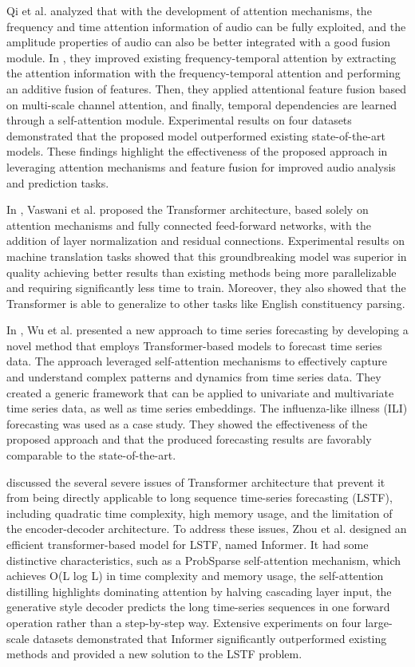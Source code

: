 Qi et al. analyzed that with the development of attention mechanisms, the frequency and time attention information of audio can be fully exploited, and the amplitude properties of audio can also be better integrated with a good fusion module.
In \cite{10019616}, they improved existing frequency-temporal attention by extracting the attention information with the frequency-temporal attention and performing an additive fusion of features.
Then, they applied attentional feature fusion based on multi-scale channel attention, and finally, temporal dependencies are learned through a self-attention module.
Experimental results on four datasets demonstrated that the proposed model outperformed existing state-of-the-art models.
These findings highlight the effectiveness of the proposed approach in leveraging attention mechanisms and feature fusion for improved audio analysis and prediction tasks.

In \cite{Vaswani2017}, Vaswani et al. proposed the Transformer architecture, based solely on attention mechanisms and fully connected feed-forward networks, with the addition of layer normalization and residual connections.
Experimental results on machine translation tasks showed that this groundbreaking model was superior in quality achieving better results than existing methods being more parallelizable and requiring significantly less time to train.
Moreover, they also showed that the Transformer is able to generalize to other tasks like English constituency parsing.

In \cite{Wu2020}, Wu et al. presented a new approach to time series forecasting by developing a novel method that employs Transformer-based models to forecast time series data.
The approach leveraged self-attention mechanisms to effectively capture and understand complex patterns and dynamics from time series data.
They created a generic framework that can be applied to univariate and multivariate time series data, as well as time series embeddings.
The influenza-like illness (ILI) forecasting was used as a case study.
They showed the effectiveness of the proposed approach and that the produced forecasting results are favorably comparable to the state-of-the-art.

\cite{Zhou2020} discussed the several severe issues of Transformer architecture that prevent it from being directly applicable to long sequence time-series forecasting (LSTF), including quadratic time complexity, high memory usage, and the limitation of the encoder-decoder architecture.
To address these issues, Zhou et al. designed an efficient transformer-based model for LSTF, named Informer.
It had some distinctive characteristics, such as a ProbSparse self-attention mechanism, which achieves O(L log L) in time complexity and memory usage, the self-attention distilling highlights dominating attention by halving cascading layer input, the generative style decoder predicts the long time-series sequences in one forward operation rather than a step-by-step way.
Extensive experiments on four large-scale datasets demonstrated that Informer significantly outperformed existing methods and provided a new solution to the LSTF problem.

